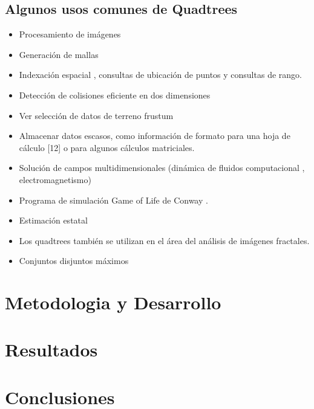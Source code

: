 \documentclass{article}
\begin{document}
\subsection{Algunos usos comunes de Quadtrees}
\begin{itemize}
    \item Procesamiento de imágenes
    \item Generación de mallas
    \item Indexación espacial , consultas de ubicación de puntos y consultas de rango.
    \item Detección de colisiones eficiente en dos dimensiones
    \item Ver selección de datos de terreno frustum
    \item Almacenar datos escasos, como información de formato para una hoja de cálculo [12] o para algunos cálculos matriciales.
    \item Solución de campos multidimensionales (dinámica de fluidos computacional , electromagnetismo)
    \item Programa de simulación Game of Life de Conway . 
    \item Estimación estatal 
    \item Los quadtrees también se utilizan en el área del análisis de imágenes fractales.
    \item Conjuntos disjuntos máximos
\end{itemize}   

\section{Metodologia y Desarrollo}

        
\section{Resultados}




\section{Conclusiones}


	
	
	
\end{document}
